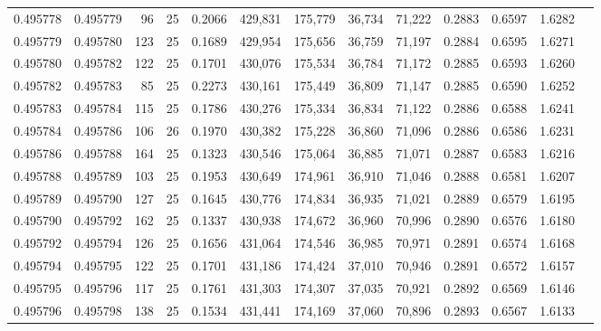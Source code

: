 \begin{tabular}{rrrrrrrrrrrrr}
0.495778 & 0.495779 &    96 &  25 &                                     0.2066 & 429,831 & 175,779 &  36,734 &  71,222 & 0.2883 & 0.6597 & 1.6282 \\
0.495779 & 0.495780 &   123 &  25 &                                     0.1689 & 429,954 & 175,656 &  36,759 &  71,197 & 0.2884 & 0.6595 & 1.6271 \\
0.495780 & 0.495782 &   122 &  25 &                                     0.1701 & 430,076 & 175,534 &  36,784 &  71,172 & 0.2885 & 0.6593 & 1.6260 \\
0.495782 & 0.495783 &    85 &  25 &                                     0.2273 & 430,161 & 175,449 &  36,809 &  71,147 & 0.2885 & 0.6590 & 1.6252 \\
0.495783 & 0.495784 &   115 &  25 &                                     0.1786 & 430,276 & 175,334 &  36,834 &  71,122 & 0.2886 & 0.6588 & 1.6241 \\
0.495784 & 0.495786 &   106 &  26 &                                     0.1970 & 430,382 & 175,228 &  36,860 &  71,096 & 0.2886 & 0.6586 & 1.6231 \\
0.495786 & 0.495788 &   164 &  25 &                                     0.1323 & 430,546 & 175,064 &  36,885 &  71,071 & 0.2887 & 0.6583 & 1.6216 \\
0.495788 & 0.495789 &   103 &  25 &                                     0.1953 & 430,649 & 174,961 &  36,910 &  71,046 & 0.2888 & 0.6581 & 1.6207 \\
0.495789 & 0.495790 &   127 &  25 &                                     0.1645 & 430,776 & 174,834 &  36,935 &  71,021 & 0.2889 & 0.6579 & 1.6195 \\
0.495790 & 0.495792 &   162 &  25 &                                     0.1337 & 430,938 & 174,672 &  36,960 &  70,996 & 0.2890 & 0.6576 & 1.6180 \\
0.495792 & 0.495794 &   126 &  25 &                                     0.1656 & 431,064 & 174,546 &  36,985 &  70,971 & 0.2891 & 0.6574 & 1.6168 \\
0.495794 & 0.495795 &   122 &  25 &                                     0.1701 & 431,186 & 174,424 &  37,010 &  70,946 & 0.2891 & 0.6572 & 1.6157 \\
0.495795 & 0.495796 &   117 &  25 &                                     0.1761 & 431,303 & 174,307 &  37,035 &  70,921 & 0.2892 & 0.6569 & 1.6146 \\
0.495796 & 0.495798 &   138 &  25 &                                     0.1534 & 431,441 & 174,169 &  37,060 &  70,896 & 0.2893 & 0.6567 & 1.6133 \\

\end{tabular}
